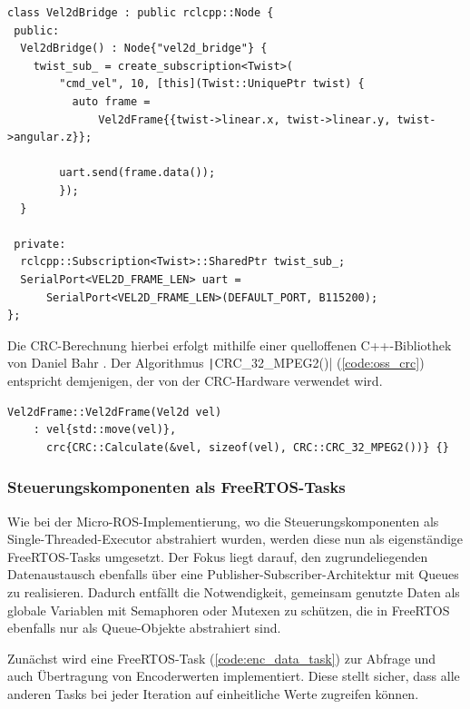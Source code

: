 \begin{code}
\begin{verbatim}
class Vel2dBridge : public rclcpp::Node {
 public:
  Vel2dBridge() : Node{"vel2d_bridge"} {
    twist_sub_ = create_subscription<Twist>(
        "cmd_vel", 10, [this](Twist::UniquePtr twist) {
          auto frame =
              Vel2dFrame{{twist->linear.x, twist->linear.y, twist->angular.z}};

        uart.send(frame.data());
        });
  }

 private:
  rclcpp::Subscription<Twist>::SharedPtr twist_sub_;
  SerialPort<VEL2D_FRAME_LEN> uart =
      SerialPort<VEL2D_FRAME_LEN>(DEFAULT_PORT, B115200);
};
\end{verbatim}
    \label{code:ros_node}
\end{code}

Die CRC-Berechnung hierbei erfolgt mithilfe einer quelloffenen C++-Bibliothek
von Daniel Bahr \cite{CRCpp}. Der Algorithmus \texttt|CRC_32_MPEG2()|
(\ref{code:oss_crc}) entspricht demjenigen, der von der CRC-Hardware verwendet
wird.

\begin{code}
\begin{verbatim}
Vel2dFrame::Vel2dFrame(Vel2d vel)
    : vel{std::move(vel)},
      crc{CRC::Calculate(&vel, sizeof(vel), CRC::CRC_32_MPEG2())} {}
\end{verbatim}
    \label{code:oss_crc}
\end{code}


\subsubsection{Steuerungskomponenten als FreeRTOS-Tasks}

Wie bei der Micro-ROS-Implementierung, wo die Steuerungskomponenten als
Single-Threaded-Executor abstrahiert wurden, werden diese nun als eigenständige
FreeRTOS-Tasks umgesetzt. Der Fokus liegt darauf, den zugrundeliegenden
Datenaustausch ebenfalls über eine Publisher-Subscriber-Architektur mit Queues
zu realisieren. Dadurch entfällt die Notwendigkeit, gemeinsam genutzte Daten als
globale Variablen mit Semaphoren oder Mutexen zu schützen, die in FreeRTOS
ebenfalls nur als Queue-Objekte abstrahiert sind.

Zunächst wird eine FreeRTOS-Task (\ref{code:enc_data_task}) zur Abfrage und auch
Übertragung von Encoderwerten implementiert. Diese stellt sicher, dass alle
anderen Tasks bei jeder Iteration auf einheitliche Werte zugreifen können.

